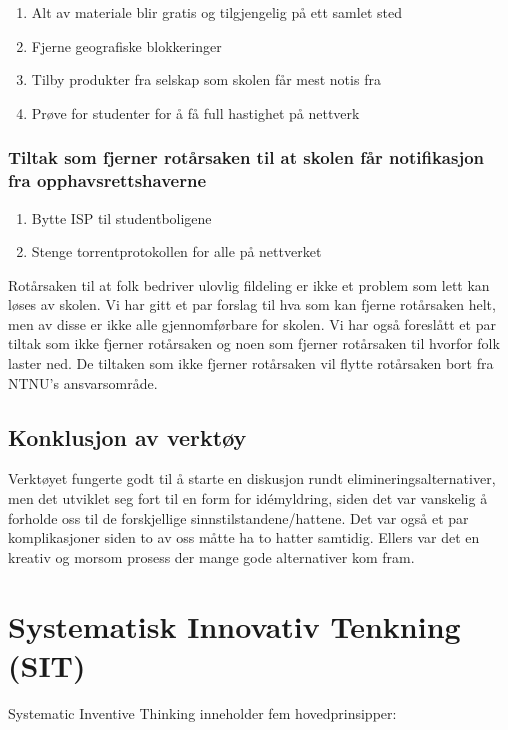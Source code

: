 \begin{enumerate}
    \item Alt av materiale blir gratis og tilgjengelig på ett samlet sted
    \item Fjerne geografiske blokkeringer
    \item Tilby produkter fra selskap som skolen får mest notis fra
    \item Prøve for studenter for å få full hastighet på nettverk
\end{enumerate}

\subsubsection*{Tiltak som fjerner rotårsaken til at skolen får notifikasjon fra opphavsrettshaverne}

\begin{enumerate}
    \item Bytte ISP til studentboligene
    \item Stenge torrentprotokollen for alle på nettverket
\end{enumerate}

Rotårsaken til at folk bedriver ulovlig fildeling er ikke et problem som lett kan løses av skolen. Vi har gitt et par forslag til hva som kan fjerne rotårsaken helt, men av disse er ikke alle gjennomførbare for skolen. Vi har også foreslått et par tiltak som ikke fjerner rotårsaken og noen som fjerner rotårsaken til hvorfor folk laster ned. De tiltaken som ikke fjerner rotårsaken vil flytte rotårsaken bort fra NTNU's ansvarsområde.

\subsection{Konklusjon av verktøy}
Verktøyet fungerte godt til å starte en diskusjon rundt elimineringsalternativer, men det utviklet seg fort til en form for idémyldring, siden det var vanskelig å forholde oss til de forskjellige sinnstilstandene/hattene. Det var også et par komplikasjoner siden to av oss måtte ha to hatter samtidig. Ellers var det en kreativ og morsom prosess der mange gode alternativer kom fram. 

\section{Systematisk Innovativ Tenkning (SIT)}
Systematic Inventive Thinking inneholder fem hovedprinsipper:

